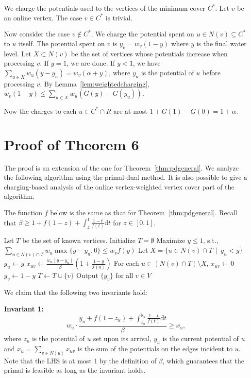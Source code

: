 We charge the potentials used to the vertices of the minimum cover $C^*$. Let $v$ be an online vertex. The case $v\in C^*$ is trivial.

Now consider the case $v\notin C^*$. We charge the potential spent on $u\in N(v)\subseteq C^*$ to $u$ itself. The potential spent on $v$ is $y_v = w_v(1-y)$ where $y$ is the final water level. 
Let $X\subset N(v)$ be the set of vertices whose potentials increase when processing $v$.
If $y =1$, we are done. If $y <1$, we have $\sum_{u\in X} w_u(y-y_u) = w_v(\alpha +y)$, where $y_u$ is the potential of $u$ before processing $v$. By Lemma~\ref{lem:weightedcharging}, $w_v(1-y) \leq \sum_{u\in X} w_u(G(y)-G(y_u))$.

Now the charges to each $u\in C^*\cap R$ are at most $1+G(1)-G(0)=1+\alpha$.

\section{ Proof of Theorem 6}
The proof is an extension of the one for Theorem~\ref{thm:pdgeneral}. We analyze the following algorithm using the primal-dual method. It is also possible to give a charging-based analysis of the online vertex-weighted vertex cover part of the algorithm.

The function $f$ below is the same as that for Theorem~\ref{thm:pdgeneral}. Recall that $\beta\geq 1+f(1-z)+\int_z^1 \frac{1-t}{f(t)}\mathrm{d}t$ for $z\in [0,1]$.

\begin{algorithm}[h!]
\SetAlgoLined
\caption{$PrimalDual-Weighted$}
\label{alg:general greedy weighted}
Let $T$ be the set of known vertices. Initialize $T=\emptyset$\;
{
Maximize $y\le 1$, s.t., $\sum_{u\in N(v)\cap T} w_u\max\{y-y_u,0\} \leq w_vf(y)$\;
Let $X = \{u \in N(v)\cap T \,\mid\, y_u < y\}$\;
{
$y_u\leftarrow y$\;
$x_{uv}\longleftarrow \frac{w_u(y-y_u)}{\beta}\left(1+\frac{1-y}{f(y)}\right)$\;
}
For each $u \in (N(v)\cap T)\setminus X$, $x_{uv}\longleftarrow 0$\;
$y_v \leftarrow 1-y$\;
$T\leftarrow T\cup \{v\}$\;
}
Output $\{y_v\}$ for all $v\in V$\;
\end{algorithm}

We claim that the following two invariants hold:

\textbf{Invariant 1:} $$w_u\cdot\frac{y_{u}+f(1-z_u)+\int_{z_u}^{y_{u}}\frac{1-t}{f(t)}\mathrm{d}t}{\beta}\geq x_{u},$$ where $z_u$ is the potential of $u$ set upon its arrival, $y_u$ is the current potential of $u$ and $x_u = \sum_{v \in N(u)} x_{uv}$ is the sum of the potentials on the edges incident to $u$. Note that the LHS is at most 1  by the definition of $\beta$, which guarantees that the primal is feasible as long as the invariant holds.

